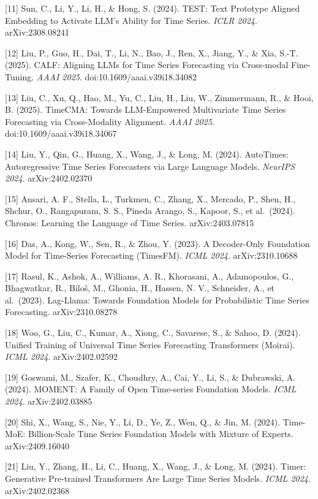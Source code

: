 {[}11{]} Sun, C., Li, Y., Li, H., \& Hong, S. (2024). TEST: Text Prototype Aligned Embedding to Activate LLM's Ability for Time Series. \emph{ICLR 2024}. arXiv:2308.08241

{[}12{]} Liu, P., Guo, H., Dai, T., Li, N., Bao, J., Ren, X., Jiang, Y., \& Xia, S.-T. (2025). CALF: Aligning LLMs for Time Series Forecasting via Cross-modal Fine-Tuning. \emph{AAAI 2025}. doi:10.1609/aaai.v39i18.34082

{[}13{]} Liu, C., Xu, Q., Hao, M., Yu, C., Liu, H., Liu, W., Zimmermann, R., \& Hooi, B. (2025). TimeCMA: Towards LLM-Empowered Multivariate Time Series Forecasting via Cross-Modality Alignment. \emph{AAAI 2025}. doi:10.1609/aaai.v39i18.34067

{[}14{]} Liu, Y., Qin, G., Huang, X., Wang, J., \& Long, M. (2024). AutoTimes: Autoregressive Time Series Forecasters via Large Language Models. \emph{NeurIPS 2024}. arXiv:2402.02370

{[}15{]} Ansari, A. F., Stella, L., Turkmen, C., Zhang, X., Mercado, P., Shen, H., Shchur, O., Rangapuram, S. S., Pineda Arango, S., Kapoor, S., et al.~(2024). Chronos: Learning the Language of Time Series. arXiv:2403.07815

{[}16{]} Das, A., Kong, W., Sen, R., \& Zhou, Y. (2023). A Decoder-Only Foundation Model for Time-Series Forecasting (TimesFM). \emph{ICML 2024}. arXiv:2310.10688

{[}17{]} Rasul, K., Ashok, A., Williams, A. R., Khorasani, A., Adamopoulos, G., Bhagwatkar, R., Biloš, M., Ghonia, H., Hassen, N. V., Schneider, A., et al.~(2023). Lag-Llama: Towards Foundation Models for Probabilistic Time Series Forecasting. arXiv:2310.08278

{[}18{]} Woo, G., Liu, C., Kumar, A., Xiong, C., Savarese, S., \& Sahoo, D. (2024). Unified Training of Universal Time Series Forecasting Transformers (Moirai). \emph{ICML 2024}. arXiv:2402.02592

{[}19{]} Goswami, M., Szafer, K., Choudhry, A., Cai, Y., Li, S., \& Dubrawski, A. (2024). MOMENT: A Family of Open Time-series Foundation Models. \emph{ICML 2024}. arXiv:2402.03885

{[}20{]} Shi, X., Wang, S., Nie, Y., Li, D., Ye, Z., Wen, Q., \& Jin, M. (2024). Time-MoE: Billion-Scale Time Series Foundation Models with Mixture of Experts. arXiv:2409.16040

{[}21{]} Liu, Y., Zhang, H., Li, C., Huang, X., Wang, J., \& Long, M. (2024). Timer: Generative Pre-trained Transformers Are Large Time Series Models. \emph{ICML 2024}. arXiv:2402.02368

